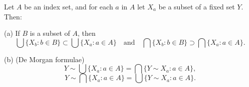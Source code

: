 Let $A$ be an index set, and for each $a$ in $A$ let $X_a$ be a subset of a fixed set $Y$. Then:

(a) If $B$ is a subset of $A$, then
$$
\bigcup \{X_b: b \in B\} \subset \bigcup \{X_a: a \in A\}
\quad\text{and}\quad
\bigcap \{X_b: b \in B\} \supset \bigcap \{X_a: a \in A\}.
$$

(b) (De Morgan formulae)
$$
Y \sim \bigcup \{X_a: a \in A\} = \bigcap \{Y \sim X_a: a \in A\},
$$
$$
Y \sim \bigcap \{X_a: a \in A\} = \bigcup \{Y \sim X_a: a \in A\}.
$$
